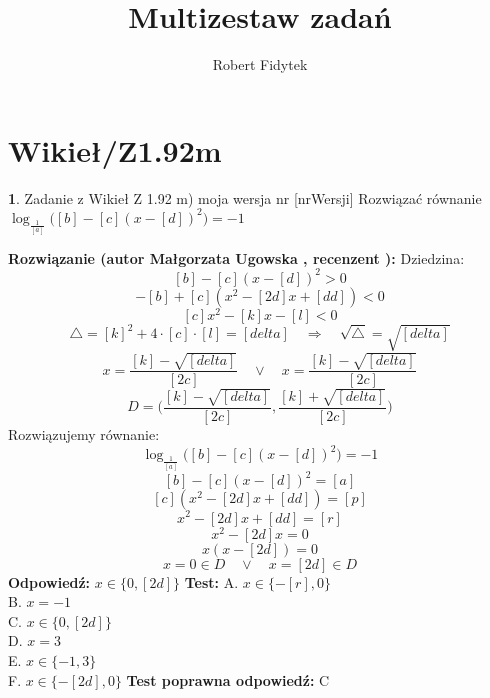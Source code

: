 \documentclass[12pt, a4paper]{article}
\title{Multizestaw zadań}
\author{Robert Fidytek}
\date{}
\theoremstyle{definition} %
\newtheorem{zad}{}
\newcommand{\kategoria}[1]{\section{#1}} %
\newcommand{\zadStart}[1]{\begin{zad}#1\newline} %
\newcommand{\zadStop}{\end{zad}}   %
\newcommand{\rozwStart}[2]{\noindent \textbf{Rozwiązanie (autor #1 , recenzent #2): }\newline} %
\newcommand{\rozwStop}{\newline}                                            %
\newcommand{\odpStart}{\noindent \textbf{Odpowiedź:}\newline}    %
\newcommand{\odpStop}{\newline}                                             %
\newcommand{\testStart}{\noindent \textbf{Test:}\newline} %
\newcommand{\testStop}{\newline} %
\newcommand{\kluczStart}{\noindent \textbf{Test poprawna odpowiedź:}\newline} %
\newcommand{\kluczStop}{\newline} %
\begin{document}
\maketitle


\kategoria{Wikieł/Z1.92m}
\zadStart{Zadanie z Wikieł Z 1.92 m) moja wersja nr [nrWersji]}
Rozwiązać równanie $ \log_{\frac{1}{[a]}}{\big([b]- [c] (x-[d])^2\big)} = -1$
\zadStop
\rozwStart{Małgorzata Ugowska}{}
Dziedzina:
$$[b]- [c] (x-[d])^2>0$$
$$ -[b]+[c] (x^2-[2d]x+[dd])<0$$
$$ [c] x^2-[k]x-[l]<0$$
$$ \bigtriangleup = [k]^2 + 4 \cdot [c] \cdot [l] = [delta] \quad  \Longrightarrow \quad \sqrt{\bigtriangleup} = \sqrt{[delta]}$$
$$x =\frac{[k]-\sqrt{[delta]}}{[2c]} \quad \vee \quad x =\frac{[k]-\sqrt{[delta]}}{[2c]}$$
$$D=\Big(\frac{[k]-\sqrt{[delta]}}{[2c]}, \frac{[k]+\sqrt{[delta]}}{[2c]}\Big)$$
Rozwiązujemy równanie:
$$\log_{\frac{1}{[a]}}{\big([b]- [c] (x-[d])^2\big)} = -1$$
$$ [b]- [c] (x-[d])^2= [a]$$
$$ [c] (x^2-[2d]x+[dd])= [p]$$
$$ x^2-[2d]x+[dd]= [r]$$
$$x^2-[2d]x=0$$
$$x(x-[2d])=0$$
$$x=0 \in D \quad \vee \quad x=[2d] \in D$$
\rozwStop
\odpStart
$x \in \{0, [2d] \}$
\odpStop
\testStart
A. $x \in \{-[r], 0 \}$\\
B. $x = -1$\\
C. $x \in \{0, [2d] \}$\\
D. $x = 3$\\
E. $x \in \{-1, 3\}$\\
F. $x \in \{-[2d], 0 \}$
\testStop
\kluczStart
C
\kluczStop
\end{document}
